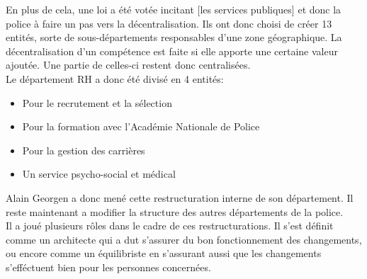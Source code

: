 \documentclass[12pt]{article}
\begin{document}
En plus de cela, une loi a été votée incitant [les services publiques] et donc la police à faire un pas vers la décentralisation. Ils ont donc choisi de créer 13 entités, sorte de sous-départements responsables d'une zone géographique. La décentralisation d'un compétence est faite si elle apporte une certaine valeur ajoutée. Une partie de celles-ci restent donc centralisées.\\

Le département RH a donc été divisé en 4 entités:
\begin{itemize}
	\item Pour le recrutement et la sélection
	\item Pour la formation avec l'Académie Nationale de Police
	\item Pour la gestion des carrières
	\item Un service psycho-social et médical
\end{itemize}

Alain Georgen a donc mené cette restructuration interne de son département. Il reste maintenant a modifier la structure des autres départements de la police.\\

Il a joué plusieurs rôles dans le cadre de ces restructurations. Il s'est définit comme un architecte qui a dut s'assurer du bon fonctionnement des changements, ou encore comme un équilibriste en s'assurant aussi que les changements s'efféctuent bien pour les personnes concernées.

\end{document}
